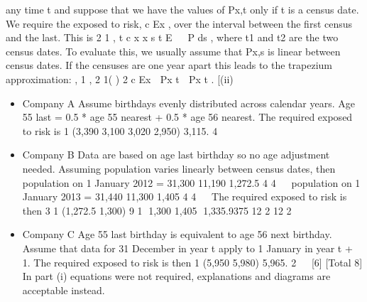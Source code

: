 \documentclass[a4paper,12pt]{article}
\begin{document}
any time t and suppose that we have the values of Px,t only if t is a census date.
We require the exposed to risk, c
Ex , over the interval between the first census
and the last.
This is
2
1
,
t
c
x x s
t
E   P ds , where t1 and t2 are the two census dates.
To evaluate this, we usually assume that Px,s is linear between census dates.
If the censuses are one year apart this leads to the trapezium approximation:
  , 1 , 2
1( )
2
c
Ex  Px t  Px t . [(ii) 
\begin{itemize}
    \item Company A
Assume birthdays evenly distributed across calendar years.
Age 55 last = 0.5 * age 55 nearest + 0.5 * age 56 nearest.
The required exposed to risk is
1 (3,390 3,100 3,020 2,950) 3,115.
4
   
\item Company B
Data are based on age last birthday so no age adjustment needed.
Assuming population varies linearly between census dates, then
population on 1 January 2012 = 31,300 11,190 1,272.5
4 4
 
population on 1 January 2013 = 31,440 11,300 1,405
4 4
 
The required exposed to risk is then
3 1 (1,272.5 1,300) 9 1 1,300 1,405 1,335.9375
12 2 12 2
   
\item Company C
Age 55 last birthday is equivalent to age 56 next birthday.
Assume that data for 31 December in year t apply to 1 January in
year t + 1.
The required exposed to risk is then
1 (5,950 5,980) 5,965.
2
  [6]
[Total 8]
In part (i) equations were not required, explanations and diagrams are acceptable instead.
\end{itemize}

\end{document}
